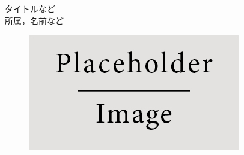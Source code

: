 \begin{minipage}[]{0.88\columnwidth}
  \Huge タイトルなど  \\[10mm]
  \Large 所属，名前など \\
\end{minipage}
\begin{minipage}[]{0.11\columnwidth}
  \begin{figure}\centering
    \includegraphics[width=\columnwidth]{placeholder.jpg}
  \end{figure}
\end{minipage}
